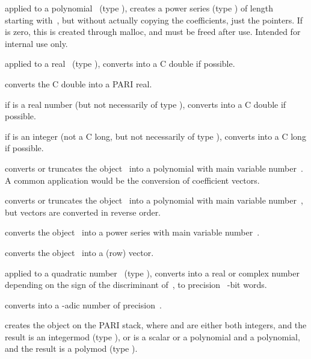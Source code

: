  applied to a
polynomial~ (type ), creates a power series (type )
of length~ starting with~, but without actually copying the
coefficients, just the pointers. If  is zero, this is created
through malloc, and must be freed after use. Intended for internal use only.

 applied to a real~ (type ),
converts  into a C double if possible.

 converts the C double  into a PARI real.

 if  is a real number (but not
necessarily of type ), converts  into a C double if possible.

 if  is an integer (not a C long,
but not necessarily of type ), converts  into a C long
if possible.

 converts or truncates the object~
into a polynomial with main variable number~. A common application
would be the conversion of coefficient vectors.

 converts or truncates the object~
into a polynomial with main variable number~, but vectors are converted
in reverse order.

 converts the object~ into a power
series with main variable number~.

 converts the object~ into a (row) vector.

 applied to a quadratic number~
(type ), converts  into a real or complex number
depending on the sign of the discriminant of~, to precision
\hbox{ \B-bit} words.%

 converts  into a -adic
number of precision~.

 creates the object 
on the PARI stack, where  and  are either both integers, and
the result is an integermod (type ), or  is a scalar or
a polynomial and  a polynomial, and the result is a polymod
(type ).

